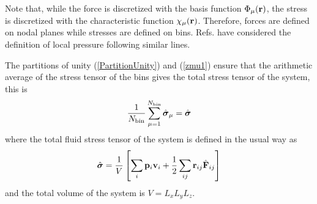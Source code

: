 \documentclass[b5paper,openright,11pt]{book}
\begin{document}
Note  that, while  the force  is discretized  with the  basis function
$\Phi_\mu({\bf r})$, the stress is discretized with the characteristic
function $\chi_\mu({\bf  r})$. Therefore, forces are  defined on nodal
planes    while    stresses    are    defined    on    bins.     Refs.
\cite{Schindler2010,Lion2012} have  considered the definition  of local
pressure following similar lines.


The partitions  of unity (\ref{PartitionUnity}) and  (\ref{zmu1}) ensure
that the arithmetic average of the stress tensor of the bins gives the
total stress tensor of the system, this is
\begin{align}
\frac{1}{N_{\rm bin}}\sum_{\mu=1}^{N_{\rm bin}}\hat{\boldsymbol{\sigma}}_{\mu}=\hat{\boldsymbol{\sigma}}
\end{align}
where the total fluid stress tensor of the system is defined in the usual way as
\begin{align}
  \hat{\boldsymbol{\sigma}}=\frac{1}{V}\left[\sum_{i}{\bf p}_i{\bf v}_i
+\frac{1}{2}\sum_{ij}{\bf r}_{ij}\hat{\bf F}_{ij}\right]
\end{align}
and the total volume of the system is $V=L_xL_yL_z$.
\end{document}
